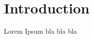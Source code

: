 \documentclass[12pt]{article}
\begin{document}

\newpage
\setcounter{page}{1}
\section{Introduction}
Lorem Ipsum bla bla bla
\end{document}
